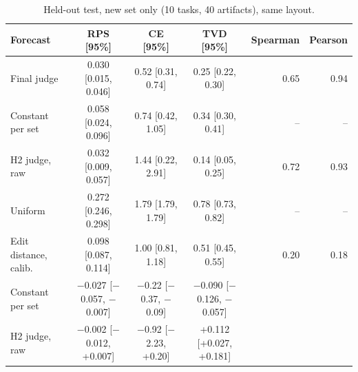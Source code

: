 \begin{table}[t]
\caption{Held-out test, new set only (10 tasks, 40 artifacts), same layout.}
\label{tab:exp27new}
\centering\footnotesize
\begin{tabular}{lcccrr}
\toprule
Forecast & RPS [95\%] & CE [95\%] & TVD [95\%] & Spearman & Pearson\\
\midrule
Final judge & 0.030 [0.015, 0.046] & 0.52 [0.31, 0.74] & 0.25 [0.22, 0.30] & 0.65 & 0.94\\
Constant per set & 0.058 [0.024, 0.096] & 0.74 [0.42, 1.05] & 0.34 [0.30, 0.41] & -- & --\\
H2 judge, raw & 0.032 [0.009, 0.057] & 1.44 [0.22, 2.91] & 0.14 [0.05, 0.25] & 0.72 & 0.93\\
Uniform & 0.272 [0.246, 0.298] & 1.79 [1.79, 1.79] & 0.78 [0.73, 0.82] & -- & --\\
Edit distance, calib. & 0.098 [0.087, 0.114] & 1.00 [0.81, 1.18] & 0.51 [0.45, 0.55] & 0.20 & 0.18\\
\midrule
Constant per set & $-$0.027 [$-$0.057, $-$0.007] & $-$0.22 [$-$0.37, $-$0.09] & $-$0.090 [$-$0.126, $-$0.057] & & \\
H2 judge, raw & $-$0.002 [$-$0.012, +0.007] & $-$0.92 [$-$2.23, +0.20] & +0.112 [+0.027, +0.181] & & \\
\bottomrule
\end{tabular}\end{table}
